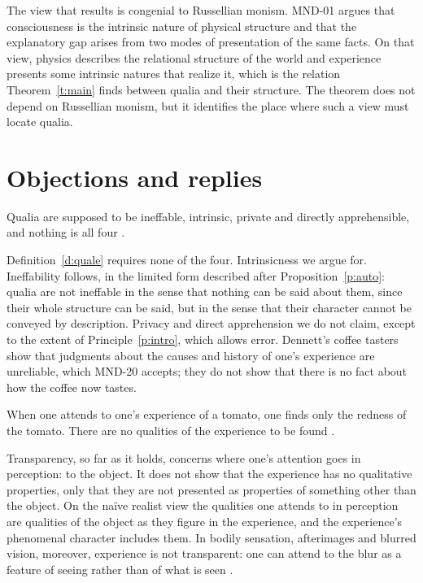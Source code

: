 \documentclass{situationist-preprint}
\begin{document}
The view that results is congenial to Russellian monism. MND-01 argues that consciousness is the intrinsic nature of physical structure and that the explanatory gap arises from two modes of presentation of the same facts. On that view, physics describes the relational structure of the world and experience presents some intrinsic natures that realize it, which is the relation Theorem~\ref{t:main} finds between qualia and their structure. The theorem does not depend on Russellian monism, but it identifies the place where such a view must locate qualia.

\section{Objections and replies}

\begin{objection}[Quining]\label{o:quine}
Qualia are supposed to be ineffable, intrinsic, private and directly apprehensible, and nothing is all four \citep{Dennett1988}.
\end{objection}

\begin{reply}
Definition~\ref{d:quale} requires none of the four. Intrinsicness we argue for. Ineffability follows, in the limited form described after Proposition~\ref{p:auto}: qualia are not ineffable in the sense that nothing can be said about them, since their whole structure can be said, but in the sense that their character cannot be conveyed by description. Privacy and direct apprehension we do not claim, except to the extent of Principle~\ref{p:intro}, which allows error. Dennett's coffee tasters show that judgments about the causes and history of one's experience are unreliable, which MND-20 accepts; they do not show that there is no fact about how the coffee now tastes.
\end{reply}

\begin{objection}[Transparency]\label{o:transp}
When one attends to one's experience of a tomato, one finds only the redness of the tomato. There are no qualities of the experience to be found \citep{Harman1990}.
\end{objection}

\begin{reply}
Transparency, so far as it holds, concerns where one's attention goes in perception: to the object. It does not show that the experience has no qualitative properties, only that they are not presented as properties of something other than the object. On the naïve realist view the qualities one attends to in perception are qualities of the object as they figure in the experience, and the experience's phenomenal character includes them. In bodily sensation, afterimages and blurred vision, moreover, experience is not transparent: one can attend to the blur as a feature of seeing rather than of what is seen \citep{Kind2003}.
\end{reply}
\end{document}
